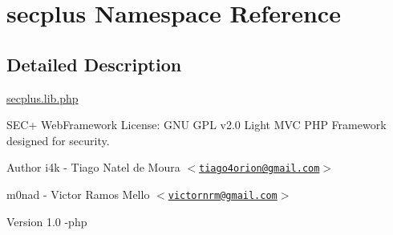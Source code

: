 \hypertarget{namespacesecplus}{
\section{secplus Namespace Reference}
\label{namespacesecplus}
}


\subsection{Detailed Description}
\hyperlink{secplus_8lib_8php}{secplus.lib.php}

SEC+ WebFramework License: GNU GPL v2.0 Light MVC PHP Framework designed for security.

\begin{DoxyAuthor}{Author}
i4k -\/ Tiago Natel de Moura $<$\href{mailto:tiago4orion@gmail.com}{\tt tiago4orion@gmail.com}$>$ 

m0nad -\/ Victor Ramos Mello $<$\href{mailto:victornrm@gmail.com}{\tt victornrm@gmail.com}$>$
\end{DoxyAuthor}
\begin{DoxyVersion}{Version}
1.0 -\/php 
\end{DoxyVersion}
